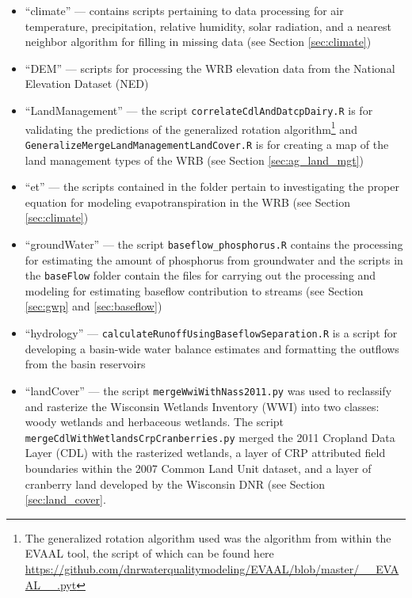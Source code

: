 \begin{itemize}
\item ``climate'' --- contains scripts pertaining to data processing for air temperature, precipitation, relative humidity, solar radiation, and a nearest neighbor algorithm for filling in missing data (see Section \ref{sec:climate})

\item ``DEM'' --- scripts for processing the WRB elevation data from the National Elevation Dataset (NED)

\item ``LandManagement'' --- the script \texttt{correlateCdlAndDatcpDairy.R} is for validating the predictions of the generalized rotation algorithm\footnote{The generalized rotation algorithm used was the algorithm from within the EVAAL tool, the script of which can be found here \url{https://github.com/dnrwaterqualitymodeling/EVAAL/blob/master/__EVAAL__.pyt}} and \texttt{GeneralizeMergeLandManagementLandCover.R} is for creating a map of the land management types of the WRB (see Section \ref{sec:ag_land_mgt})

\item ``et'' --- the scripts contained in the folder pertain to investigating the proper equation for modeling evapotranspiration in the WRB (see Section \ref{sec:climate})

\item ``groundWater'' --- the script \texttt{baseflow\_phosphorus.R} contains the processing for estimating the amount of phosphorus from groundwater and the scripts in the \texttt{baseFlow} folder contain the files for carrying out the processing and modeling for estimating baseflow contribution to streams (see Section \ref{sec:gwp} and \ref{sec:baseflow})

\item ``hydrology'' --- \texttt{calculateRunoffUsingBaseflowSeparation.R} is a script for developing a basin-wide water balance estimates and formatting the outflows from the basin reservoirs

\item ``landCover'' --- the script \texttt{mergeWwiWithNass2011.py} was used to reclassify and rasterize the Wisconsin Wetlands Inventory (WWI) into two classes: woody wetlands and herbaceous wetlands. The script \texttt{mergeCdlWithWetlandsCrpCranberries.py} merged the 2011 Cropland Data Layer (CDL) with the rasterized wetlands, a layer of CRP attributed field boundaries within the 2007 Common Land Unit dataset, and a layer of cranberry land developed by the Wisconsin DNR (see Section \ref{sec:land_cover}.


\end{itemize}
